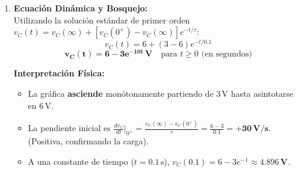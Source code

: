 \documentclass[11pt, a4paper]{article}
\begin{document}
\begin{enumerate}
    \item \textbf{Ecuación Dinámica y Bosquejo:} \\
    Utilizando la solución estándar de primer orden $v_C(t) = v_C(\infty) + [v_C(0^+) - v_C(\infty)]e^{-t/\tau}$:
    $$v_C(t) = 6 + (3 - 6)e^{-t/0.1}$$
    $$\mathbf{v_C(t) = 6 - 3e^{-10t} \,\text{V}} \quad \text{para } t \ge 0 \text{ (en segundos)}$$
    
    \textbf{Interpretación Física:}
    \begin{itemize}
        \item La gráfica \textbf{asciende} monótonamente partiendo de $3\,\text{V}$ hasta asintotarse en $6\,\text{V}$.
        \item La pendiente inicial es $\frac{dv_C}{dt}\Big|_{0^+} = \frac{v_C(\infty) - v_C(0^+)}{\tau} = \frac{6 - 3}{0.1} = \mathbf{+30\,\text{V/s}}$. (Positiva, confirmando la carga).
        \item A una constante de tiempo ($t = 0.1\,\text{s}$), $v_C(0.1) = 6 - 3e^{-1} \approx \mathbf{4.896\,\text{V}}$.
    \end{itemize}
\end{enumerate}
\end{document}
